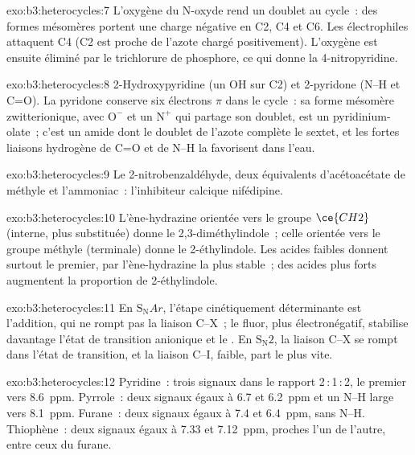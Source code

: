 \begin{solution}{exo:b3:heterocycles:7}
L'oxygène du N-oxyde rend un doublet au cycle~: des formes mésomères
portent une charge négative en C2, C4 et C6. Les électrophiles attaquent C4
(C2 est proche de l'azote chargé positivement). L'oxygène est ensuite
éliminé par le trichlorure de phosphore, ce qui donne la 4-nitropyridine.
\end{solution}

\begin{solution}{exo:b3:heterocycles:8}
2-Hydroxypyridine (un OH sur C2) et 2-pyridone (N--H et C=O). La pyridone conserve six
électrons $\pi$ dans le cycle~: sa forme mésomère zwitterionique, avec $\mathrm{O^-}$ et un
$\mathrm{N^+}$ qui partage son doublet, est un pyridinium-olate~; c'est un amide dont le
doublet de l'azote complète le sextet, et les fortes liaisons hydrogène
de C=O et de N--H la favorisent dans l'eau.
\end{solution}

\begin{solution}{exo:b3:heterocycles:9}
Le 2-nitrobenzaldéhyde, deux équivalents d'acétoacétate de méthyle et
l'ammoniac~: l'inhibiteur calcique nifédipine.
\end{solution}

\begin{solution}{exo:b3:heterocycles:10}
L'ène-hydrazine orientée vers le groupe $\ce{CH2}$ (interne, plus substituée) donne le
2,3-diméthylindole~; celle orientée vers le groupe méthyle (terminale)
donne le 2-éthylindole. Les acides faibles donnent surtout le premier, par
l'ène-hydrazine la plus stable~; des acides plus forts augmentent la
proportion de 2-éthylindole.
\end{solution}

\begin{solution}{exo:b3:heterocycles:11}
En $\mathrm S_\mathrm NAr$, l'étape cinétiquement déterminante est l'addition, qui ne rompt pas la liaison C--X~;
le fluor, plus électronégatif, stabilise davantage l'état de transition
anionique et le . En $\mathrm S_\mathrm N2$, la liaison C--X se rompt dans
l'état de transition, et la liaison C--I, faible, part le plus vite.
\end{solution}

\begin{solution}{exo:b3:heterocycles:12}
Pyridine~: trois signaux dans le rapport 2\,:\,1\,:\,2, le premier vers \qty{8.6}{ppm}. Pyrrole~: deux signaux égaux
à 6.7 et \qty{6.2}{ppm} et un N--H large vers \qty{8.1}{ppm}. Furane~: deux signaux égaux à
7.4 et \qty{6.4}{ppm}, sans N--H. Thiophène~: deux signaux égaux à 7.33 et \qty{7.12}{ppm}, proches
l'un de l'autre, entre ceux du furane.
\end{solution}

